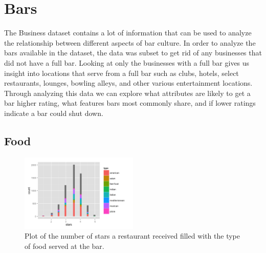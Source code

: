 \documentclass[11pt]{article}
\begin{document}
\section{Bars}

The Business dataset contains a lot of information that can be used to analyze the relationship between different aspects of bar culture.  In order to analyze the bars available in the dataset, the data was subset to get rid of any businesses that did not have a full bar.  Looking at only the businesses with a full bar gives us insight into locations that serve from a full bar such as clubs, hotels, select restaurants, lounges, bowling alleys, and other various entertainment locations.  Through analyzing this data we can explore what attributes are likely to get a bar higher rating, what features bars most commonly share, and if lower ratings indicate a bar   
could shut down.

\subsection{Food}

\begin{figure}[h!]
  \caption{Plot of the number of stars a restaurant received filled with the type of food served at the bar.}
  \centering
  \label{food}
    \includegraphics[width=0.5\textwidth]{Food_bars.png}
\end{figure}
\end{document}

